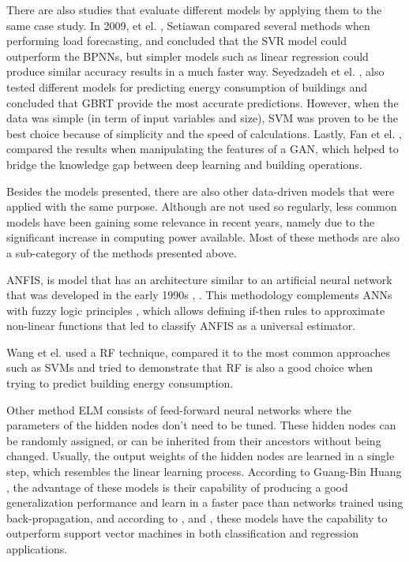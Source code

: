 There are also studies that evaluate different models by applying them to the same case study. In 2009, et el. \cite{svmr0}, Setiawan compared several methods when performing load forecasting, and concluded that the \ac{SVR} model could outperform the \ac{BPNN}s, but simpler models such as linear regression could produce similar accuracy results in a much faster way. Seyedzadeh et el. \cite{other2}, also tested different models for predicting energy consumption of buildings and concluded that \ac{GBRT} provide the most accurate predictions. However, when the data was simple (in term of input variables and size), \ac{SVM} was proven to be the best choice because of simplicity and the speed of calculations. Lastly, Fan et el. \cite{other1}, compared the results when manipulating the features of a \ac{GAN}, which helped to bridge the knowledge gap between deep learning and building operations. 

Besides the models presented, there are also other data-driven models that were applied with the same purpose. Although are not used so regularly, less common models have been gaining some relevance in recent years, namely due to the significant increase in computing power available. Most of these methods are also a sub-category of the methods presented above. 

\ac{ANFIS}, is model that has an architecture similar to an artificial neural network that was developed in the early 1990s \cite{anfis1}, \cite{anfis2}. This methodology complements \ac{ANN}s with fuzzy logic principles \cite{anfis3}, which allows defining if-then rules to approximate non-linear functions that led \cite{anfis4} to classify \ac{ANFIS} as a universal estimator.


Wang et el. \cite{rf0} used a \ac{RF} technique, compared it to the most common approaches such as \ac{SVM}s and tried to demonstrate that RF is also a good choice when trying to predict building energy consumption.

Other method \ac{ELM} consists of feed-forward neural networks where the parameters of the hidden nodes don't need to be tuned. These hidden nodes can be randomly assigned, or can be inherited from their ancestors without being changed. Usually, the output weights of the hidden nodes are learned in a single step, which resembles the linear learning process. According to Guang-Bin Huang \cite{elm1}, the advantage of these models is their capability of producing a good generalization performance and learn in a faster pace than networks trained using back-propagation, and according to \cite{elm2}, \cite{elm3} and \cite{elm4}, these models have the capability to outperform support vector machines in both classification and regression applications.



